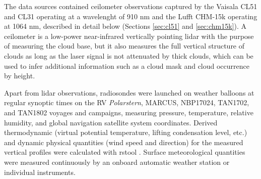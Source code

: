 \documentclass[12pt,a4paper]{article}
\begin{document}
The data sources contained ceilometer observations captured by the Vaisala CL51
and CL31 operating at a wavelenght of 910 nm and the Lufft CHM-15k operating at
1064 nm, described in detail below (Sections \ref{sec:cl51} and
\ref{sec:chm15k}). A ceilometer is a low-power near-infrared vertically
pointing lidar with the purpose of measuring the cloud base, but it also
measures the full vertical structure of clouds as long as the laser signal is
not attenuated by thick clouds, which can be used to infer additional
information such as a cloud mask and cloud occurrence by height.

Apart from lidar observations, radiosondes were launched on weather balloons at
regular synoptic times on the RV \emph{Polarstern}, MARCUS, NBP17024, TAN1702,
and TAN1802 voyages and campaigns, measuring pressure, temperature, relative
humidity, and global navigation satellite system coordinates. Derived
thermodynamic (virtual potential temperature, lifting condensation level, etc.)
and dynamic physical quantities (wind speed and direction) for the measured
vertical profiles were calculated with rstool \citep{rstool}. Surface
meteorological quantities were measured continuously by an onboard automatic
weather station or individual instruments.
\end{document}
